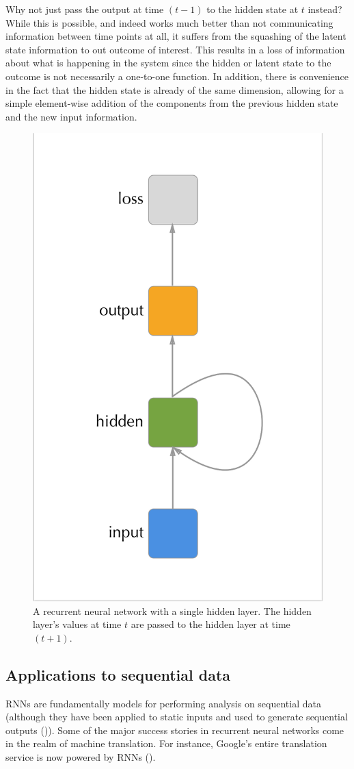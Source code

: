 \documentclass[]{book}
\theoremstyle{definition}
\theoremstyle{definition}
\theoremstyle{definition}
\theoremstyle{remark}
\begin{document}
Why not just pass the output at time \((t-1)\) to the hidden state at
\(t\) instead? While this is possible, and indeed works much better than
not communicating information between time points at all, it suffers
from the squashing of the latent state information to out outcome of
interest. This results in a loss of information about what is happening
in the system since the hidden or latent state to the outcome is not
necessarily a one-to-one function. In addition, there is convenience in
the fact that the hidden state is already of the same dimension,
allowing for a simple element-wise addition of the components from the
previous hidden state and the new input information.

\begin{figure}

{\centering \includegraphics[width=0.4\linewidth]{figures/rnn_compact} 

}

\caption{A recurrent neural network with a single hidden layer. The hidden layer's values at time $t$ are passed to the hidden layer at time $(t + 1)$.}\label{fig:cyclegraph}
\end{figure}

\subsection{Applications to sequential
data}\label{applications-to-sequential-data}

RNNs are fundamentally models for performing analysis on sequential data
(although they have been applied to static inputs and used to generate
sequential outputs (\citet{rnn_captions})). Some of the major success
stories in recurrent neural networks come in the realm of machine
translation. For instance, Google's entire translation service is now
powered by RNNs (\citet{google_translate}).
\end{document}
